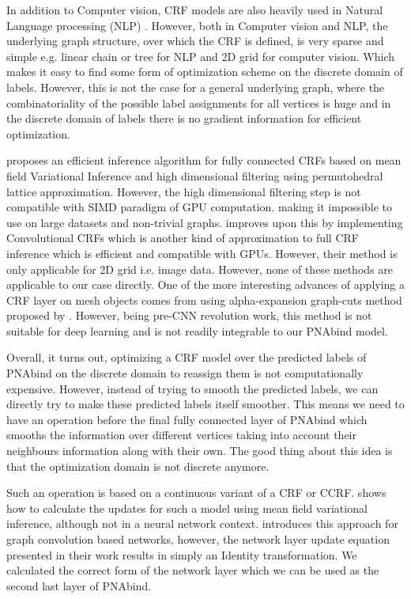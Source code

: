 In addition to Computer vision, CRF models are also heavily used in Natural Language processing (NLP)
\citep{roark2004discriminative,mccallum2003early,liu2017identification}. However, both in Computer vision and NLP, the underlying graph structure, over which the CRF is defined, is very sparse and simple e.g. linear chain or tree for NLP and 2D grid for computer vision. Which makes it easy to
find some form of optimization scheme on the discrete domain of labels. However, this is not the
case for a general underlying graph, where the combinatoriality of the possible label assignments
for all vertices is huge and in the discrete domain of labels there is no gradient information for
efficient optimization.

\citet{krahenbuhl2012efficient} proposes an efficient inference algorithm for fully connected CRFs
based on mean field Variational Inference and high dimensional filtering using permutohedral lattice
approximation. However, the high dimensional filtering step is not compatible with
SIMD\citep{nickolls2008scalable} paradigm of GPU computation. \citep{teichmann2018convolutional}
making it impossible to use on large datasets and non-trivial graphs.
\citet{teichmann2018convolutional} improves upon this by implementing Convolutional CRFs which is
another kind of approximation to full CRF inference which is efficient and compatible with GPUs.
However, their method is only applicable for 2D grid i.e. image data.  However, none of these methods
are applicable to our case directly. One of the more interesting advances of applying a CRF layer on
mesh objects comes from \citet{kalogerakis2010learning} using alpha-expansion graph-cuts method proposed by
\citet{boykov2001fast}. However, being pre-CNN revolution work, this method is not suitable for deep
learning and is not readily integrable to our PNAbind model. 
\par
Overall, it turns out, optimizing a CRF model over the predicted labels of PNAbind on the discrete domain to reassign them is not computationally expensive. However, instead of trying to smooth the predicted labels, we can directly try to make these predicted labels itself smoother. This means we need to have an operation before the final fully connected layer of PNAbind which smooths the information over different vertices taking into account their neighbours information along with their own. The good thing about this idea is that the optimization domain is not discrete anymore.

Such an operation is based on a continuous variant of a CRF or CCRF. \citet{ristovski2013continuous}
shows how to calculate the updates for such a model using mean field variational inference, although
not in a neural network context. \citet{gao2019conditional} introduces this approach for graph convolution based networks, however, the network layer update equation presented in their work results in simply an Identity transformation. We calculated the correct
form of the network layer which we can be used as the second last layer of PNAbind.

